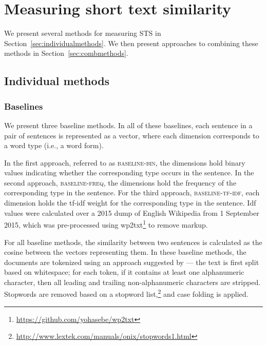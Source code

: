\documentclass[11pt,letterpaper]{article}
\newcommand{\secref}[1]{Section~\ref{#1}}
\newcommand{\baselinebin}{\textsc{baseline-bin}\xspace}
\newcommand{\baselinefreq}{\textsc{baseline-freq}\xspace}
\newcommand{\baselinetfidf}{\textsc{baseline-tf-idf}\xspace}
\begin{document}
\section{Measuring short text similarity}

We present several methods for measuring STS in
\secref{sec:individualmethods}. We then present approaches to
combining these methods in \secref{sec:combmethods}.


\subsection{Individual methods\label{sec:individualmethods}}


\subsubsection{Baselines}


We present three baseline methods. In all of these baselines, each
sentence in a pair of sentences is represented as a vector, where each
dimension corresponds to a word type (i.e., a word form).

In the first approach, referred to as \baselinebin, the dimensions
hold binary values indicating whether the corresponding type occurs in
the sentence. In the second approach, \baselinefreq, the dimensions
hold the frequency of the corresponding type in the sentence. For the
third approach, \baselinetfidf, each dimension holds the tf-idf weight
for the corresponding type in the sentence. Idf values were calculated
over a 2015 dump of English Wikipedia from 1 September 2015, which was
pre-processed using
wp2txt\footnote{\url{https://github.com/yohasebe/wp2txt}} to remove
markup.

For all baseline methods, the similarity between two sentences is
calculated as the cosine between the vectors representing them.  In
these baseline methods, the documents are tokenized using an approach
suggested by \cite{Speriosu+:2011} --- the text is first split based
on whitespace; for each token, if it contains at least one
alphanumeric character, then all leading and trailing non-alphanumeric
characters are stripped. Stopwords are removed based on a stopword
list,\footnote{\url{http://www.lextek.com/manuals/onix/stopwords1.html}}
and case folding is applied.
\end{document}
